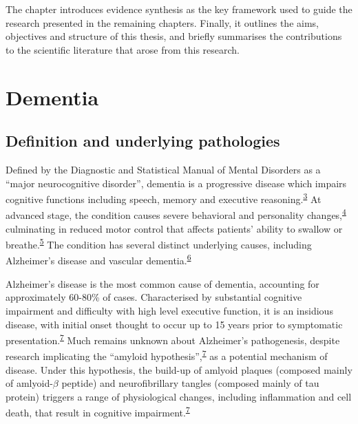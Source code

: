 \documentclass[a4paper, twoside]{templates/ociamthesis}
\begin{document}
The chapter introduces evidence synthesis as the key framework used to guide the research presented in the remaining chapters. Finally, it outlines the aims, objectives and structure of this thesis, and briefly summarises the contributions to the scientific literature that arose from this research.

\hypertarget{dementia}{%
\section{Dementia}\label{dementia}}

\hypertarget{underlying-pathologies}{%
\subsection{Definition and underlying pathologies}\label{underlying-pathologies}}

Defined by the Diagnostic and Statistical Manual of Mental Disorders as a ``major neurocognitive disorder'', dementia is a progressive disease which impairs cognitive functions including speech, memory and executive reasoning.\textsuperscript{\protect\hyperlink{ref-edition2013}{3}} At advanced stage, the condition causes severe behavioral and personality changes,\textsuperscript{\protect\hyperlink{ref-cerejeira2012}{4}} culminating in reduced motor control that affects patients' ability to swallow or breathe.\textsuperscript{\protect\hyperlink{ref-kumar2013}{5}} The condition has several distinct underlying causes, including Alzheimer's disease and vascular dementia.\textsuperscript{\protect\hyperlink{ref-burns2009}{6}}

Alzheimer's disease is the most common cause of dementia, accounting for approximately 60-80\% of cases. Characterised by substantial cognitive impairment and difficulty with high level executive function, it is an insidious disease, with initial onset thought to occur up to 15 years prior to symptomatic presentation.\textsuperscript{\protect\hyperlink{ref-robinson2015}{7}} Much remains unknown about Alzheimer's pathogenesis, despite research implicating the ``amyloid hypothesis'',\textsuperscript{\protect\hyperlink{ref-robinson2015}{7}} as a potential mechanism of disease. Under this hypothesis, the build-up of amlyoid plaques (composed mainly of amlyoid-\(\beta\) peptide) and neurofibrillary tangles (composed mainly of tau protein) triggers a range of physiological changes, including inflammation and cell death, that result in cognitive impairment.\textsuperscript{\protect\hyperlink{ref-robinson2015}{7}}
\end{document}
